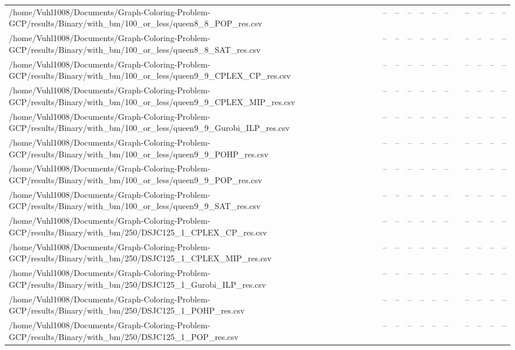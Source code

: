 \begin{table}[htbp]
\begin{tabular}{llllllllllll}
/home/Vuhl1008/Documents/Graph-Coloring-Problem-GCP/results/Binary/with\_bm/100\_or\_less/queen8\_8\_POP\_res.csv & -- & -- & -- & -- & -- & -- & {} & -- & -- & -- & -- \\
/home/Vuhl1008/Documents/Graph-Coloring-Problem-GCP/results/Binary/with\_bm/100\_or\_less/queen8\_8\_SAT\_res.csv & -- & -- & -- & -- & -- & -- & {} & -- & -- & -- & -- \\
/home/Vuhl1008/Documents/Graph-Coloring-Problem-GCP/results/Binary/with\_bm/100\_or\_less/queen9\_9\_CPLEX\_CP\_res.csv & -- & -- & -- & -- & -- & -- & {} & -- & -- & -- & -- \\
/home/Vuhl1008/Documents/Graph-Coloring-Problem-GCP/results/Binary/with\_bm/100\_or\_less/queen9\_9\_CPLEX\_MIP\_res.csv & -- & -- & -- & -- & -- & -- & {} & -- & -- & -- & -- \\
/home/Vuhl1008/Documents/Graph-Coloring-Problem-GCP/results/Binary/with\_bm/100\_or\_less/queen9\_9\_Gurobi\_ILP\_res.csv & -- & -- & -- & -- & -- & -- & {} & -- & -- & -- & -- \\
/home/Vuhl1008/Documents/Graph-Coloring-Problem-GCP/results/Binary/with\_bm/100\_or\_less/queen9\_9\_POHP\_res.csv & -- & -- & -- & -- & -- & -- & {} & -- & -- & -- & -- \\
/home/Vuhl1008/Documents/Graph-Coloring-Problem-GCP/results/Binary/with\_bm/100\_or\_less/queen9\_9\_POP\_res.csv & -- & -- & -- & -- & -- & -- & {} & -- & -- & -- & -- \\
/home/Vuhl1008/Documents/Graph-Coloring-Problem-GCP/results/Binary/with\_bm/100\_or\_less/queen9\_9\_SAT\_res.csv & -- & -- & -- & -- & -- & -- & {} & -- & -- & -- & -- \\
/home/Vuhl1008/Documents/Graph-Coloring-Problem-GCP/results/Binary/with\_bm/250/DSJC125\_1\_CPLEX\_CP\_res.csv & -- & -- & -- & -- & -- & -- & {} & -- & -- & -- & -- \\
/home/Vuhl1008/Documents/Graph-Coloring-Problem-GCP/results/Binary/with\_bm/250/DSJC125\_1\_CPLEX\_MIP\_res.csv & -- & -- & -- & -- & -- & -- & {} & -- & -- & -- & -- \\
/home/Vuhl1008/Documents/Graph-Coloring-Problem-GCP/results/Binary/with\_bm/250/DSJC125\_1\_Gurobi\_ILP\_res.csv & -- & -- & -- & -- & -- & -- & {} & -- & -- & -- & -- \\
/home/Vuhl1008/Documents/Graph-Coloring-Problem-GCP/results/Binary/with\_bm/250/DSJC125\_1\_POHP\_res.csv & -- & -- & -- & -- & -- & -- & {} & -- & -- & -- & -- \\
/home/Vuhl1008/Documents/Graph-Coloring-Problem-GCP/results/Binary/with\_bm/250/DSJC125\_1\_POP\_res.csv & -- & -- & -- & -- & -- & -- & {} & -- & -- & -- & -- \\

\end{tabular}
\end{table}
